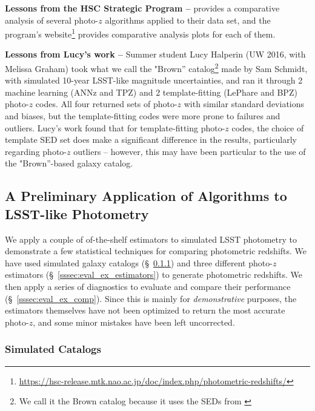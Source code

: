 \documentclass[DM,lsstdraft,toc]{lsstdoc}
\begin{document}
\textbf{Lessons from the HSC Strategic Program --} \cite{2018PASJ...70S...9T} provides a comparative analysis of several photo-$z$ algorithms applied to their data set, and the program's website\footnote{\url{https://hsc-release.mtk.nao.ac.jp/doc/index.php/photometric-redshifts/}} provides comparative analysis plots for each of them.

\textbf{Lessons from Lucy's work --} Summer student Lucy Halperin (UW 2016, with Melissa Graham) took what we call the "Brown'' catalog\footnote{We call it the Brown catalog because it uses the SEDs from \cite{2014ApJS..212...18B}} made by Sam Schmidt, with simulated 10-year LSST-like magnitude uncertainties, and ran it through 2 machine learning (ANNz and TPZ) and 2 template-fitting (LePhare and BPZ) photo-$z$ codes. All four returned sets of photo-$z$ with similar standard deviations and biases, but the template-fitting codes were more prone to failures and outliers. Lucy's work found that for template-fitting photo-$z$ codes, the choice of template SED set does make a significant difference in the results, particularly regarding photo-$z$ outliers -- however, this may have been particular to the use of the "Brown''-based galaxy catalog.


\subsection{A Preliminary Application of Algorithms to LSST-like Photometry}\label{ssec:eval_ex}

We apply a couple of of-the-shelf estimators to simulated LSST photometry to demonstrate a few statistical techniques for comparing photometric redshifts.
We have used simulated galaxy catalogs (\S~\ref{sssec:eval_ex_cats}) and three different photo-$z$ estimators (\S~\ref{sssec:eval_ex_estimators}) to generate photometric redshifts. 
We then apply a series of diagnostics to evaluate and compare their performance (\S~\ref{sssec:eval_ex_comp}).
Since this is mainly for {\it demonstrative} purposes, the estimators themselves have not been optimized to return the most accurate photo-$z$, and some minor mistakes have been left uncorrected.

\subsubsection{Simulated Catalogs}\label{sssec:eval_ex_cats}
\end{document}
